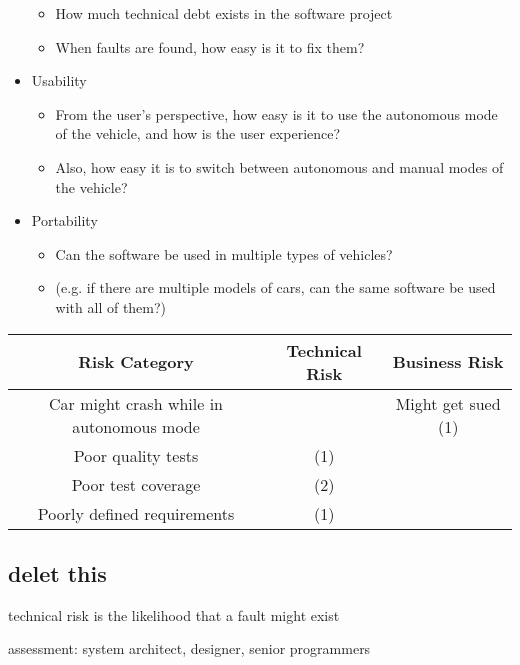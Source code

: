 \documentclass[letterpaper]{article}
\begin{document}
\begin{itemize}
\begin{itemize}
		      \item How much technical debt exists in the software project
		      \item When faults
		            are found, how easy is it to fix them?
	      \end{itemize}
	\item Usability
	      \begin{itemize}
		      \item From the user's perspective, how easy is it to use the autonomous mode of the vehicle, and how is the user experience?
		      \item Also, how easy it is to switch between autonomous and manual modes of the vehicle?
	      \end{itemize}
	\item Portability
	      \begin{itemize}
		      \item Can the software be used in multiple types of vehicles?
		      \item (e.g. if there are multiple models of cars, can the same software be used with all of them?)
	      \end{itemize}
\end{itemize}

\begin{table}[H]
	\centering
	\begin{tabular}{c|c|c|}
		Risk Category                            & Technical Risk & Business Risk      \\ \hline
		Car might crash while in autonomous mode &                & Might get sued (1) \\ \hline
		Poor quality tests                       & (1)            &                    \\ \hline
		Poor test coverage                       & (2)            &                    \\ \hline
		Poorly defined requirements              & (1)            &                    \\ \hline
	\end{tabular}
\end{table}

\subsection{delet this}
technical risk is the likelihood that a fault might exist

assessment: system architect, designer, senior programmers
\end{document}
